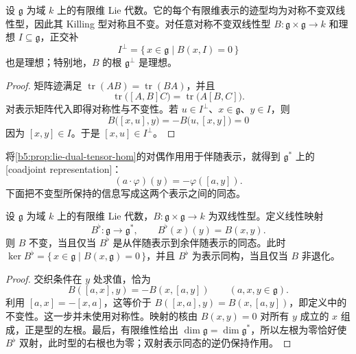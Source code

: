 \begin{proposition}\label{b5:prop:invariant-trace-form}
	设 \(\mathfrak g\) 为域 \(k\) 上的有限维 Lie 代数。它的每个有限维表示的迹型均为对称不变双线性型，因此其 Killing 型对称且不变。对任意对称不变双线性型 \(B:\mathfrak g\times\mathfrak g\to k\) 和理想 \(I\subseteq\mathfrak g\)，正交补
	\[
		I^\perp=\bigl\{\,x\in\mathfrak g\mid B(x,I)=0\,\bigr\}
	\]
	也是理想；特别地，\(B\) 的根 \(\mathfrak g^\perp\) 是理想。
\end{proposition}
\begin{proof}
	矩阵迹满足 \(\operatorname{tr}(AB)=\operatorname{tr}(BA)\)，并且
	\[
		\operatorname{tr}\bigl([A,B]C\bigr)=\operatorname{tr}\bigl(A[B,C]\bigr).
	\]
	对表示矩阵代入即得对称性与不变性。若 \(u\in I^\perp\)、\(x\in\mathfrak g\)、\(y\in I\)，则
	\[
		B\bigl([x,u],y\bigr)=-B\bigl(u,[x,y]\bigr)=0
	\]
	因为 \([x,y]\in I\)。于是 \([x,u]\in I^\perp\)。
\end{proof}

将\cref{b5:prop:lie-dual-tensor-hom}的对偶作用用于伴随表示，就得到 \(\mathfrak g^*\) 上的[coadjoint representation]：
\[
	(a\cdot\varphi)(y)=-\varphi([a,y]).
\]
下面把不变型所保持的信息写成这两个表示之间的同态。

\begin{proposition}\label{b5:prop:invariant-form-coadjoint}
	设 \(\mathfrak g\) 为域 \(k\) 上的有限维 Lie 代数，\(B:\mathfrak g\times\mathfrak g\to k\) 为双线性型。定义线性映射
	\[
		B^\flat:\mathfrak g\longrightarrow\mathfrak g^*, \qquad B^\flat(x)(y)=B(x,y).
	\]
	则 \(B\) 不变，当且仅当 \(B^\flat\) 是从伴随表示到余伴随表示的同态。此时 \(\ker B^\flat=\{\,x\in\mathfrak g\mid B(x,\mathfrak g)=0\,\}\)，并且 \(B^\flat\) 为表示同构，当且仅当 \(B\) 非退化。
\end{proposition}
\begin{proof}
	交织条件在 \(y\) 处求值，恰为
	\[
		B([a,x],y)=-B(x,[a,y])\qquad(a,x,y\in\mathfrak g).
	\]
	利用 \([a,x]=-[x,a]\)，这等价于 \(B([x,a],y)=B(x,[a,y])\)，即定义中的不变性。这一步并未使用对称性。映射的核由 \(B(x,y)=0\) 对所有 \(y\) 成立的 \(x\) 组成，正是型的左根。最后，有限维性给出 \(\dim\mathfrak g=\dim\mathfrak g^*\)，所以左根为零恰好使 \(B^\flat\) 双射，此时型的右根也为零；双射表示同态的逆仍保持作用。
\end{proof}

